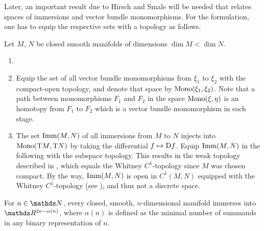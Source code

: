 Later, an important result due to Hirsch and Smale will be needed that
relates spaces of immersions and vector bundle monomorphisms.
For the formulation, one has to equip the respective sets with a
topology as follows.
\begin{Def}
  Let $M$, $N$ be closed smooth manifolds of dimensions $\dim M < \dim N$.
  \begin{enumerate}
  \item %
  \item
    Equip the set of all vector bundle monomorphisms from $\xi_1$ to
    $\xi_2$ with the compact-open topology, and denote that space by
    $\mathrm{Mono}({\xi_1},{\xi_2})$.
    Note that a path between monomorphisms $F_1$ and $F_2$ in the
    space $\mathrm{Mono}({\xi},{\eta})$ is an homotopy from $F_1$ to $F_2$ which is
    a vector bundle monomorphism in each stage.
  \item %
    The set $\mathrm{Imm}({M},{N})$ of all immersions from $M$ to $N$ injects
    into $\mathrm{Mono}({\mathrm{T}M},{\mathrm{T}N})$ by taking the differential
    $f\mapsto\mathrm{D} f$.
    Equip $\mathrm{Imm}({M},{N})$ in the following with the subspace topology.
    This results in the weak topology described in
    \cite[Section~2.1]{hirsch}, which equals the Whitney
    $C^1$-topology since $M$ was chosen compact.
    By the way, $\mathrm{Imm}({M},{N})$ is open in $C^1(M,N)$ equipped with the
    Whitney $C^1$-topology
    (see \cite[Section~2.1, Theorem~1.1]{hirsch}),
    and thus not a discrete space.
  \end{enumerate}
\end{Def}


\begin{Thm}\label{thm:immersionconj}
  For $n\in\Nat$, every closed, smooth, $n$-dimensional manifold
  immerses into $\R^{2n-\alpha(n)}$, where $\alpha(n)$ is defined as
  the minimal number of summands in any binary representation of $n$.
\end{Thm}

